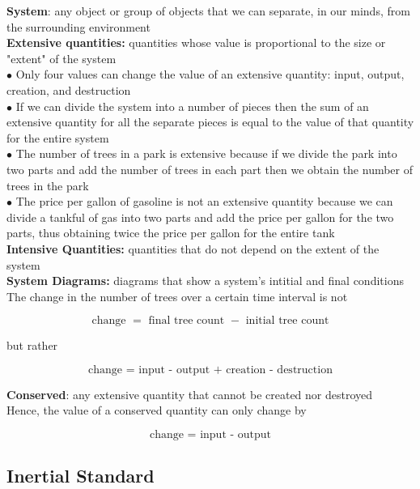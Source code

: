         \textbf{System}: any object or group of objects that we can separate, in our minds, from the surrounding environment \\
        \textbf{Extensive quantities:} quantities whose value is proportional to the size or "extent" of the system \\
        $\bullet$ Only four values can change the value of an extensive quantity: input, output, creation, and destruction \\
        $\bullet$ If we can divide the system into a number of pieces then the sum of an extensive quantity for all the separate pieces is equal to the value of that quantity for the entire system \\
        $\bullet$ The number of trees in a park is extensive because if we divide the park into two parts and add the number of trees in each part then we obtain the number of trees in the park \\
        $\bullet$ The price per gallon of gasoline is not an extensive quantity because we can divide a tankful of gas into two parts and add the price per gallon for the two parts, thus obtaining twice the price per
        gallon for the entire tank \\

        \textbf{Intensive Quantities:} quantities that do not depend on the extent of the system \\
        \textbf{System Diagrams:} diagrams that show a system's intitial and final conditions \\

        The change in the number of trees over a certain time interval is not

        \[
            \text{change } = \text{ final tree count } - \text{ initial tree count}
        \]

        but rather

        \[
            \text{change } = \text{ input - output + creation - destruction}
        \]

        \textbf{Conserved}: any extensive quantity that cannot be created nor destroyed \\
        Hence, the value of a conserved quantity can only change by

        \[
            \text{change } = \text{ input - output}
        \]



    \subsection{Inertial Standard}

